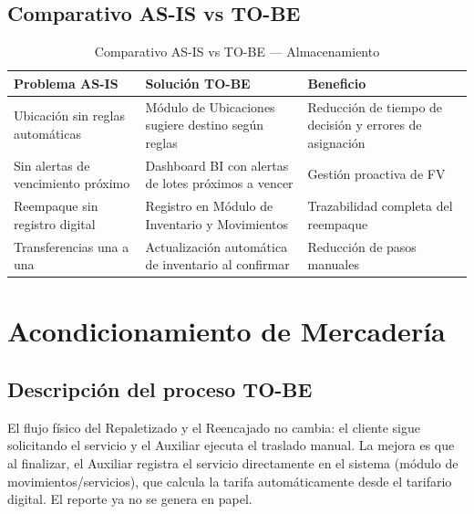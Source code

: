 \documentclass[11pt, a4paper, oneside]{report}
\begin{document}
\subsection{Comparativo AS-IS vs TO-BE}

\begin{table}[H]
\centering\small
\renewcommand{\arraystretch}{1.3}
\setlength{\tabcolsep}{4pt}
\begin{tabularx}{\textwidth}{|>{\raggedright\arraybackslash}p{}|>{\raggedright\arraybackslash}p{}|>{\raggedright\arraybackslash}X|}
\hline
\rowcolor{upeu_dark}
\color{white}\bfseries Problema AS-IS & \color{white}\bfseries Solución TO-BE & \color{white}\bfseries Beneficio \\ \hline
\rowcolor{gray!10}
Ubicación sin reglas automáticas & Módulo de Ubicaciones sugiere destino según reglas & Reducción de tiempo de decisión y errores de asignación \\ \hline
Sin alertas de vencimiento próximo & Dashboard BI con alertas de lotes próximos a vencer & Gestión proactiva de FV \\ \hline
\rowcolor{gray!10}
Reempaque sin registro digital & Registro en Módulo de Inventario y Movimientos & Trazabilidad completa del reempaque \\ \hline
Transferencias una a una & Actualización automática de inventario al confirmar & Reducción de pasos manuales \\ \hline
\end{tabularx}
\caption{Comparativo AS-IS vs TO-BE --- Almacenamiento}
\end{table}

\section{Acondicionamiento de Mercadería}

\subsection{Descripción del proceso TO-BE}

El flujo físico del Repaletizado y el Reencajado no cambia: el cliente sigue solicitando el servicio y el Auxiliar ejecuta el traslado manual. La mejora es que al finalizar, el Auxiliar registra el servicio directamente en el sistema (módulo de movimientos/servicios), que calcula la tarifa automáticamente desde el tarifario digital. El reporte ya no se genera en papel.
\end{document}
